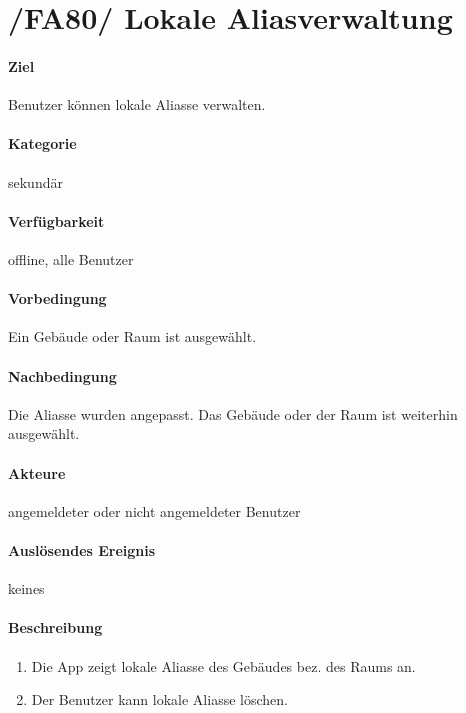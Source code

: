 \section{/FA80/ Lokale Aliasverwaltung}
\label{Lokale_Aliasverwaltung}
\label{/FA80/}
\paragraph{Ziel}
Benutzer können lokale Aliasse verwalten.
\paragraph{Kategorie}
sekundär
\paragraph{Verfügbarkeit}
offline, alle Benutzer
\paragraph{Vorbedingung}
Ein Gebäude oder Raum ist ausgewählt.
\paragraph{Nachbedingung}
Die Aliasse wurden angepasst. Das Gebäude oder der Raum ist weiterhin ausgewählt.
\paragraph{Akteure}
angemeldeter oder nicht angemeldeter Benutzer
\paragraph{Auslösendes Ereignis} keines
\paragraph{Beschreibung}
\begin{enumerate}
      \item Die App zeigt lokale Aliasse des Gebäudes bez. des Raums an.
      \item Der Benutzer kann lokale Aliasse löschen.
\end{enumerate}